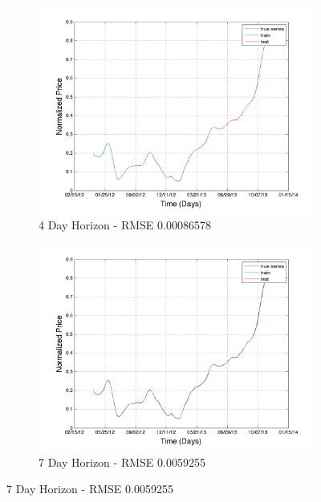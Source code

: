 \begin{figure}
        \centering
        \begin{subfigure}[b]{0.5\textwidth}
                \includegraphics[width=\textwidth]{img/model/beef/model1/pred_4}
                \caption{4 Day Horizon - RMSE 0.00086578 }
                \label{fig:gull}
        \end{subfigure}%
        \begin{subfigure}[b]{0.5\textwidth}
                \includegraphics[width=\textwidth]{img/model/beef/model1/pred_7}
                \caption{7 Day Horizon - RMSE 0.0059255}
                \label{fig:tiger}
        \end{subfigure}
       

\end{figure}
